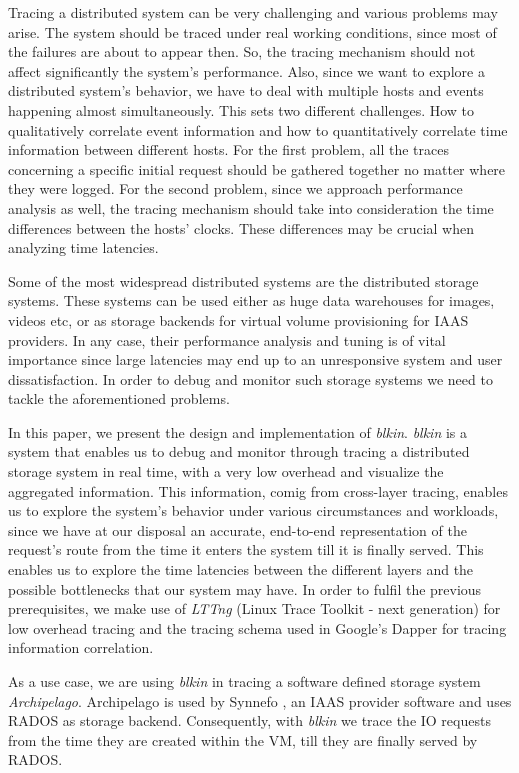 \documentclass[a4paper,10pt,twocolumn]{article}
\begin{document}
Tracing a distributed system can be very challenging and various problems may
arise. The system should be traced under real working conditions, since most of
the failures are about to appear then. So, the tracing mechanism should not
affect significantly the system's performance. Also, since we want to explore a
distributed system's behavior, we have to deal with multiple hosts and events
happening almost simultaneously. This sets two different challenges.  How to
qualitatively correlate event information and how to quantitatively correlate
time information between different hosts. For the first problem, all the traces
concerning a specific initial request should be gathered together no matter
where they were logged. For the second problem, since we approach performance
analysis as well, the tracing mechanism should take into consideration the time
differences between the hosts' clocks. These differences may be crucial when
analyzing time latencies.

Some of the most widespread distributed systems are the distributed storage
systems. These systems can be used either as huge data warehouses for images,
videos etc, or as storage backends for virtual volume provisioning for IAAS
providers. In any case, their performance analysis and tuning is of vital
importance since large latencies may end up to an unresponsive system and user
dissatisfaction. In order to debug and monitor such storage systems we need to
tackle the aforementioned problems.

In this paper, we present the design and implementation of \emph{blkin}.
\emph{blkin} is a system that enables us to debug and monitor through tracing a
distributed storage system in real time, with a very low overhead and visualize
the aggregated information. This information, comig from cross-layer tracing,
enables us to explore the system's behavior under various circumstances and
workloads, since we have at our disposal an accurate, end-to-end representation
of the request's route from the time it enters the system till it is finally
served. This enables us to explore the time latencies between the different
layers and the possible bottlenecks that our system may have. In order to fulfil
the previous prerequisites, we make use of \emph{LTTng} (Linux Trace Toolkit -
next generation)\cite{lttng} for low overhead tracing and the tracing schema
used in Google's Dapper for tracing information correlation.

As a use case, we are using \emph{blkin} in tracing a software defined storage
system \emph{Archipelago}\cite{archip}. Archipelago is used by Synnefo
\cite{synnefo}, an IAAS provider software and uses RADOS\cite{rados} as storage
backend. Consequently, with \emph{blkin} we trace the IO requests from the time
they are created within the VM, till they are finally served by RADOS.
\end{document}

